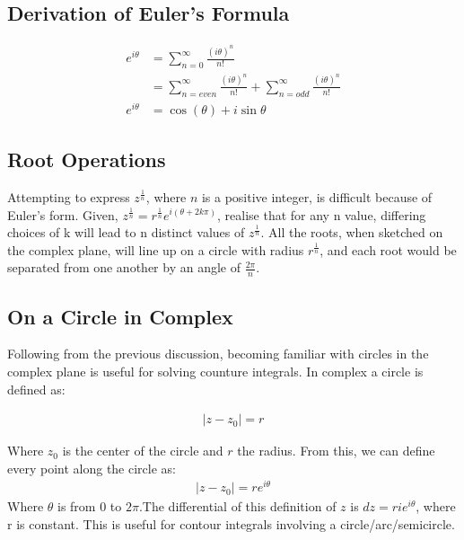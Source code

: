 \documentclass[12pt]{article}
\begin{document}
\subsection{Derivation of Euler's Formula}
\begin{equation}
    \begin{aligned}
	    e^{i \theta} &= \sum_{n=0}^{\infty}{\frac{(i \theta)^n}{n!}}\\
			 &= \sum_{n=even}^{\infty}{\frac{(i \theta)^n}{n!}} + \sum_{n=odd}^{\infty}{\frac{(i \theta)^n}{n!}}\\
	    e^{i \theta} &= \cos(\theta) + i\sin{\theta}
    \end{aligned}
\end{equation}

\subsection{Root Operations}
Attempting to express $z^{\frac{1}{n}}$, where $n$ is a positive integer, is difficult because of Euler's form. Given, $z^{\frac{1}{n}} = r^{\frac{1}{n}}e^{i(\theta +2k \pi)}$, realise that for any n value, differing choices of k will lead to n distinct values of $z^{\frac{1}{n}}$. All the roots, when sketched on the complex plane, will line up on a circle with radius $r^{\frac{1}{n}}$, and each root would be separated from one another by an angle of $\frac{2\pi}{n}$.

\subsection{On a Circle in Complex}
Following from the previous discussion, becoming familiar with circles in the complex plane is useful for solving counture integrals. In complex a circle is defined as: 

\begin{equation}
    \begin{aligned}
	    |z-z_0| = r
    \end{aligned}
\end{equation}

Where $z_0$ is the center of the circle and $r$ the radius. From this, we can define every point along the circle as:
\begin{equation}
    \begin{aligned}
	    |z-z_0| = re^{i \theta}
    \end{aligned}
\end{equation}
Where $\theta$ is from $0$ to $2\pi$.The differential of this definition of $z$ is $dz = rie^{i \theta}$, where r is constant. This is useful for contour integrals involving a circle/arc/semicircle.  
\end{document}
